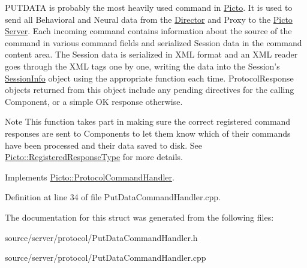 P\-U\-T\-D\-A\-T\-A is probably the most heavily used command in \hyperlink{namespace_picto}{Picto}. It is used to send all Behavioral and Neural data from the \hyperlink{class_director}{Director} and Proxy to the \hyperlink{namespace_picto}{Picto} \hyperlink{class_server}{Server}. Each incoming command contains information about the source of the command in various command fields and serialized Session data in the command content area. The Session data is serialized in X\-M\-L format and an X\-M\-L reader goes through the X\-M\-L tags one by one, writing the data into the Session's \hyperlink{class_session_info}{Session\-Info} object using the appropriate function each time. Protocol\-Response objects returned from this object include any pending directives for the calling Component, or a simple O\-K response otherwise. \begin{DoxyNote}{Note}
This function takes part in making sure the correct registered command responses are sent to Components to let them know which of their commands have been processed and their data saved to disk. See \hyperlink{namespace_picto_1_1_registered_response_type}{Picto\-::\-Registered\-Response\-Type} for more details. 
\end{DoxyNote}


Implements \hyperlink{struct_picto_1_1_protocol_command_handler_aeeaa16fe40f10fd55996d74e16e29cad}{Picto\-::\-Protocol\-Command\-Handler}.



Definition at line 34 of file Put\-Data\-Command\-Handler.\-cpp.



The documentation for this struct was generated from the following files\-:\begin{DoxyCompactItemize}
\item 
source/server/protocol/Put\-Data\-Command\-Handler.\-h\item 
source/server/protocol/Put\-Data\-Command\-Handler.\-cpp\end{DoxyCompactItemize}
